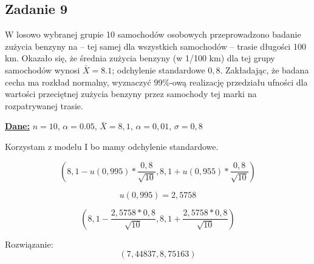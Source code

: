 \subsection{Zadanie 9}
W losowo wybranej grupie 10 samochodów osobowych przeprowadzono badanie zużycia benzyny na -- tej samej dla wszystkich samochodów -- trasie długości 100 km. Okazało się, że średnia zużycia benzyny (w 1/100 km) dla tej grupy samochodów wynosi $\bar X = 8.1$; odchylenie standardowe $0,8$. Zakładając, że badana cecha ma rozkład normalny, wyznaczyć 99\%-ową realizację przedziału ufności dla wartości przeciętnej zużycia benzyny przez samochody tej marki na rozpatrywanej trasie.  


\textbf{\underline{Dane:}}
$n = 10$, 
$\alpha = 0.05$,
$\bar X = 8,1$,
$ \alpha = 0,01$,
$\sigma = 0,8$


Korzystam z modelu I bo mamy odchylenie standardowe.

$$ ( 8,1-u(0,995)*\frac{0,8}{\sqrt{10}} , 8,1 + u(0,955)*\frac{0,8}{\sqrt{10}} ) $$

$$ u(0,995) = 2,5758  $$

$$ (8,1 - \frac{2,5758*0,8}{\sqrt{10}}, 8,1 + \frac{2,5758*0,8}{\sqrt{10}}) $$

Rozwiązanie:
\\

$$ (7,44837   ,   8,75163)  $$
